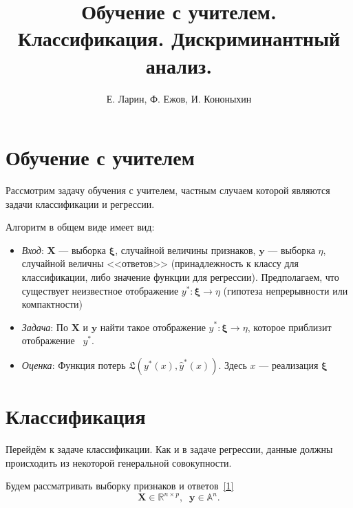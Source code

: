 \documentclass[11pt, oneside]{article}   	%
\begin{document}
	\author{Е. Ларин, Ф. Ежов, И. Кононыхин }
	\title{Обучение с учителем. Классификация. Дискриминантный анализ. }
%		
%		
	\date{}


		\maketitle 

		\section{Обучение с учителем}
		Рассмотрим задачу обучения с учителем, частным случаем которой являются задачи классификации и регрессии.

		Алгоритм в общем виде имеет вид:
		\begin{itemize}
			\item \textit{Вход}: $\bm{X}$ --- выборка $\bm{\xi}$, случайной величины признаков, $\bm{y}$ --- выборка $\eta$, случайной величны <<ответов>> (принадлежность к классу для классификации, либо значение функции для регрессии). Предполагаем, что существует неизвестное отображение $y^*: \bm{\xi} \to \eta$  (гипотеза непрерывности или компактности)
			
			\item \textit{Задача}: По $\bm{X}$ и $\bm{y}$ найти такое отображение $\hat{y}^*: \bm{\xi} \to \eta$, которое приблизит отображение  $y^*$. 
			
			\item \textit{Оценка}: Функция потерь $\mathfrak{L}(y^*(x), \hat{y}^*(x))$. Здесь $x$ --- реализация $\bm{\xi}$
		\end{itemize}

		\section{Классификация}
		Перейдём к задаче классификации. Как и в задаче регрессии, данные должны происходить из некоторой генеральной совокупности. 
		
		Будем рассматривать выборку признаков и ответов~\ref{1}
		\begin{equation}
			\bm{X} \in \mathbb{R}^{n\times p}, \;\;\mathbf{y}\in \mathbb{A}^n.
			\label{1}
		\end{equation}
		
\end{document}
